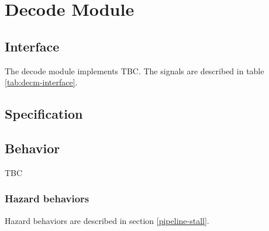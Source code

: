 \section{Decode Module}

  \subsection{Interface}

    \begin{content}
        The decode module implements TBC. The signals are described in table \ref{tab:decm-interface}. 
      \end{content}

    

  \subsection{Specification}


  \subsection{Behavior}

    \begin{content}
        TBC
      \end{content}

    \subsubsection{Hazard behaviors}

      \begin{content}
          Hazard behaviors are described in section \ref{pipeline-stall}.
        \end{content}

\newpage
